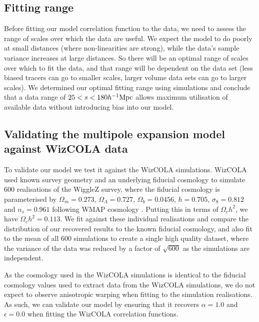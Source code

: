 \documentclass[iop,twocolappendix]{emulateapj}
\newcommand{\hMpc}{h^{-1} {\rm Mpc}} %
\begin{document}
\subsection{Fitting range} \label{sec:trunc}
Before fitting our model correlation function to the data, we need to assess the range of scales over which the data are useful.  We expect the model to do poorly at small distances (where non-linearities are strong), while the data's sample variance increases at large distances.  So there will be an optimal range of scales over which to fit the data, and that range will be dependent on the data set (less biased tracers can go to smaller scales, larger volume data sets can go to larger scales).  We determined our optimal fitting range using simulations \citep[see][]{HintonThesis2015}  and conclude that a data range of $25 < s < 180 \hMpc$ allows maximum utilisation of available data without introducing bias into our model. 




\subsection{Validating the multipole expansion model against WizCOLA data}

 To validate our model we test it against the WizCOLA simulations.  WizCOLA used known survey geometry and an underlying fiducial cosmology to simulate 600 realisations of the WiggleZ survey, where the fiducial cosmology is parameterised by $\Omega_m = 0.273$, $\Omega_\Lambda = 0.727$, $\Omega_b = 0.0456$, $h=0.705$, $\sigma_8 = 0.812$ and $n_s = 0.961$ following WMAP cosmology \citep{Komatsu2009}.  Putting this in terms of $\Omega_c h^2$, we have $\Omega_c h^2 = 0.113$. We fit against these individual realisations and compare the distribution of our recovered results to the known fiducial cosmology, and also fit to the mean of all 600 simulations to create a single high quality dataset, where the variance of the data was reduced by a factor of $\sqrt{600}$ as the simulations are independent. 





As the cosmology used in the WizCOLA simulations is identical to the fiducial cosmology values used to extract data from the WizCOLA simulations, we do not expect to observe anisotropic warping when fitting to the simulation realisations.   As such, we can validate our model by ensuring that it recovers $\alpha = 1.0$ and $\epsilon = 0.0$ when fitting the WizCOLA correlation functions.
\end{document}
